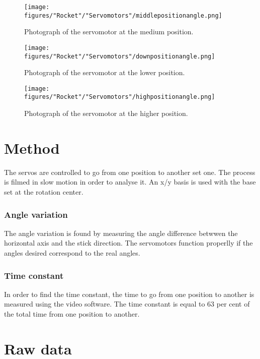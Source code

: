 \begin{figure} [htbp]
	\centering
	\texttt{[image: figures/"Rocket"/"Servomotors"/middlepositionangle.png]}
	\caption{Photograph of the servomotor at the medium position.} \label{fig:ServoInitialPosition}
\end{figure}

\begin{figure} [htbp]
	\centering
	\texttt{[image: figures/"Rocket"/"Servomotors"/downpositionangle.png]}
	\caption{Photograph of the servomotor at the lower position.} \label{fig:ServoLowPosition}
\end{figure}

\begin{figure} [htbp]
	\centering
	\texttt{[image: figures/"Rocket"/"Servomotors"/highpositionangle.png]}
	\caption{Photograph of the servomotor at the higher position.} \label{fig:ServoHighPosition}
\end{figure}


	\section*{Method}
	
 The servos are controlled to go from one position to another set one. The process is filmed in slow motion in order to analyse it. An x/y basis is used with the base set at the rotation center.
  
		\subsubsection*{Angle variation}
		
The angle variation is found by measuring the angle difference betwwen the horizontal axis and the stick direction. The servomotors function properlly if the angles desired correspond to the real angles.

		\subsubsection*{Time constant}
		
In order to find the time constant, the time to go from one position to another is measured using the video software. The time constant is equal to 63 per cent of the total time from one position to another. 



	\section*{Raw data}
	
